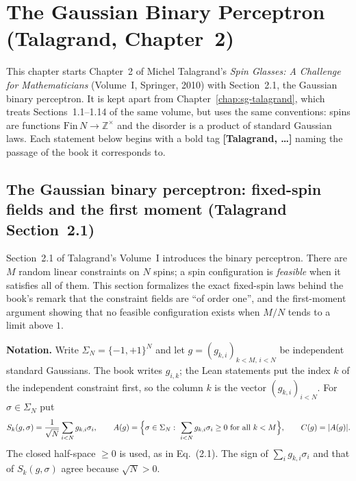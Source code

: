 \chapter{The Gaussian Binary Perceptron (Talagrand, Chapter~2)}\label{chap:sg-talagrand-perceptron}

This chapter starts Chapter~2 of Michel Talagrand's \emph{Spin Glasses: A Challenge for Mathematicians}
(Volume~I, Springer, 2010) with Section~2.1, the Gaussian binary perceptron. It is kept apart from
Chapter~\ref{chap:sg-talagrand}, which treats Sections~1.1--1.14 of the same volume, but uses the same
conventions: spins are functions $\mathrm{Fin}\,N\to\mathbb Z^\times$ and the disorder is a product of
standard Gaussian laws. Each statement below begins with a bold tag \textbf{[Talagrand, \dots]} naming the
passage of the book it corresponds to.

\section{The Gaussian binary perceptron: fixed-spin fields and the first moment (Talagrand Section~2.1)}\label{sec:sg-tal:perceptron-introduction}

Section~2.1 of Talagrand's Volume~I introduces the binary perceptron. There are $M$ random linear
constraints on $N$ spins; a spin configuration is \emph{feasible} when it satisfies all of them. This
section formalizes the exact fixed-spin laws behind the book's remark that the constraint fields are
``of order one'', and the first-moment argument showing that no feasible configuration exists when
$M/N$ tends to a limit above $1$.

\medskip\noindent\textbf{Notation.} Write $\Sigma_N=\{-1,+1\}^N$ and let $g=(g_{k,i})_{k<M,\,i<N}$ be
independent standard Gaussians. The book writes $g_{i,k}$; the Lean statements put the index $k$ of the
independent constraint first, so the column $k$ is the vector $(g_{k,i})_{i<N}$. For $\sigma\in\Sigma_N$ put
\[
S_k(g,\sigma)=\frac1{\sqrt N}\sum_{i<N}g_{k,i}\sigma_i,\qquad
A(g)=\Bigl\{\sigma\in\Sigma_N:\ \sum_{i<N}g_{k,i}\sigma_i\ge0\ \text{for all }k<M\Bigr\},\qquad
C(g)=|A(g)|.
\]
The closed half-space $\ge0$ is used, as in Eq.~(2.1). The sign of $\sum_i g_{k,i}\sigma_i$ and that of
$S_k(g,\sigma)$ agree because $\sqrt N>0$.

